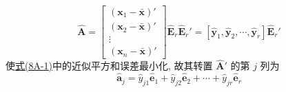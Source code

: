 \[
\hat{\mathbf{A}}=\begin{bmatrix}(\mathbf{x}_1-\bar{\mathbf{x}})'\\(\mathbf{x}_2-\bar{\mathbf{x}})'\\\vdots\\(\mathbf{x}_n-\bar{\mathbf{x}})'\end{bmatrix}\hat{\mathbf{E}}_r\hat{\mathbf{E}}_r'=[\hat{\mathbf{y}}_1,\hat{\mathbf{y}}_2,\cdots,\hat{\mathbf{y}}_r]\hat{\mathbf{E}}_r'
\]
使\hyperref[eq:8A-1]{式(8A-1)}中的近似平方和误差最小化, 故其转置 $\hat{\mathbf{A}}'$ 的第 $j$ 列为
\[
\hat{\mathbf{a}}_j=\hat{y}_{j1}\hat{\mathbf{e}}_1+\hat{y}_{j2}\hat{\mathbf{e}}_2+\cdots+\hat{y}_{jr}\hat{\mathbf{e}}_r
\]
